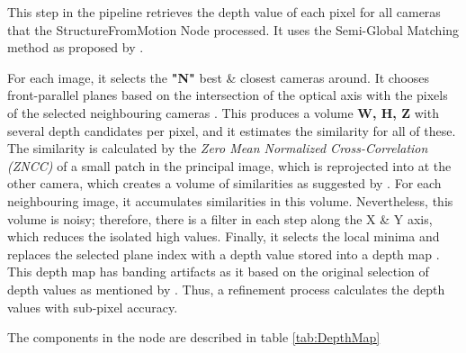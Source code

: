 \documentclass[12pt]{report}
\begin{document}
  This step in the pipeline retrieves the depth value of each pixel for all cameras that the StructureFromMotion Node processed.
  It uses the Semi-Global Matching method as proposed by \citet*{Hirschmuller2005}.
  
  For each image, it selects the \textbf{"N"} best \& closest cameras around. It chooses front-parallel planes based on the intersection of the optical axis with the pixels of the selected neighbouring cameras .
  This produces a volume \textbf{W, H, Z} with several depth candidates per pixel, and it estimates the similarity for all of these. The similarity is calculated by the \textit{Zero Mean Normalized Cross-Correlation (ZNCC)}
  of a small patch in the principal image, which is reprojected into at the other camera, which creates a volume of similarities as suggested by .
  For each neighbouring image, it accumulates similarities in this volume. Nevertheless, this volume is noisy; therefore,  there is a filter in each step along the X \& Y axis, which reduces the isolated high values.
  Finally, it selects the local minima and replaces the selected plane index with a depth value stored into a depth map . This depth map has banding artifacts as it based on the original selection of depth values as mentioned by .
  Thus, a refinement process calculates the depth values with sub-pixel accuracy.
  
  The components in the node are described in table \ref{tab:DepthMap}
  
\end{document}
